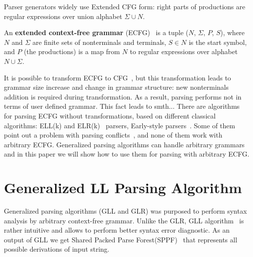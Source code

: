 \documentclass[runningheads,a4paper]{llncs}
\begin{document}


Parser generators widely use Extended CFG form: right parts of productions are regular 
expressions over union alphabet $\Sigma \cup N$. 
\begin{mydef}
An \textbf{extended context-free grammar} (ECFG)~\cite{ECFG} is a tuple ($N$, $\Sigma$, $P$, $S$), where $N$
and $\Sigma$ are finite sets of nonterminals and terminals, $ S\in N$ is the start symbol,
and $P$ (the productions) is a map from $N$ to regular expressions over alphabet $N \cup \Sigma$.
\end{mydef}

It is possible to transform ECFG to CFG~\cite{ELL}, but this transformation leads to grammar size 
increase and change in grammar structure: new nonterminals addition is required during transformation.
As a result, parsing performs not in terms of user defined grammar.
This fact leads to smth... 
There are algorithms for parsing ECFG without transformations, based on different classical algorithms: 
ELL(k) and ELR(k)~\cite{ELL} parsers, Early-style parsers~\cite{!!!}.
Some of them point out a problem with parsing conflicts~\cite{}, and none of them work with arbitrary ECFG.
Generalized parsing algorithms can handle arbitrary grammars and in this paper we
will show how to use them for parsing with arbitrary ECFG.




\section{Generalized LL Parsing Algorithm}%

Generalized parsing algorithms (GLL and GLR) was purposed to perform syntax analysis by arbitrary context-free 
grammar. Unlike the GLR, GLL algorithm~\cite{scott2010gll} is rather intuitive and allows to perform better syntax error diagnostic.
As an output of GLL we get Shared Packed Parse Forest(SPPF)~\cite{scott2013gll} that represents all possible derivations of input string.
\end{document}
